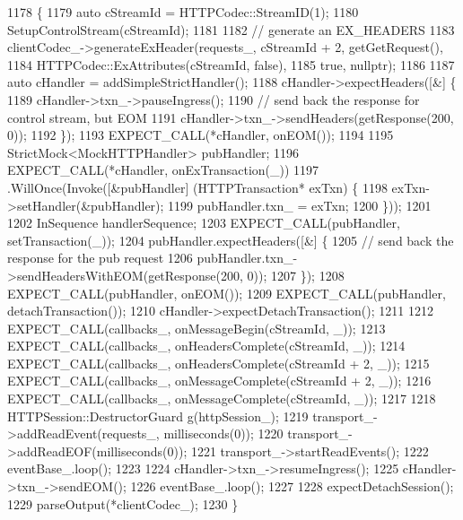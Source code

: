 \begin{DoxyCode}
1178                                                              \{
1179   \textcolor{keyword}{auto} cStreamId = HTTPCodec::StreamID(1);
1180   SetupControlStream(cStreamId);
1181 
1182   \textcolor{comment}{// generate an EX\_HEADERS}
1183   clientCodec\_->generateExHeader(requests\_, cStreamId + 2, getGetRequest(),
1184                                  HTTPCodec::ExAttributes(cStreamId, \textcolor{keyword}{false}),
1185                                  \textcolor{keyword}{true}, \textcolor{keyword}{nullptr});
1186 
1187   \textcolor{keyword}{auto} cHandler = addSimpleStrictHandler();
1188   cHandler->expectHeaders([&] \{
1189       cHandler->txn\_->pauseIngress();
1190       \textcolor{comment}{// send back the response for control stream, but EOM}
1191       cHandler->txn\_->sendHeaders(getResponse(200, 0));
1192     \});
1193   EXPECT\_CALL(*cHandler, onEOM());
1194 
1195   StrictMock<MockHTTPHandler> pubHandler;
1196   EXPECT\_CALL(*cHandler, onExTransaction(\_))
1197     .WillOnce(Invoke([&pubHandler] (HTTPTransaction* exTxn) \{
1198           exTxn->setHandler(&pubHandler);
1199           pubHandler.txn\_ = exTxn;
1200         \}));
1201 
1202   InSequence handlerSequence;
1203   EXPECT\_CALL(pubHandler, setTransaction(\_));
1204   pubHandler.expectHeaders([&] \{
1205       \textcolor{comment}{// send back the response for the pub request}
1206       pubHandler.txn\_->sendHeadersWithEOM(getResponse(200, 0));
1207     \});
1208   EXPECT\_CALL(pubHandler, onEOM());
1209   EXPECT\_CALL(pubHandler, detachTransaction());
1210   cHandler->expectDetachTransaction();
1211 
1212   EXPECT\_CALL(callbacks\_, onMessageBegin(cStreamId, \_));
1213   EXPECT\_CALL(callbacks\_, onHeadersComplete(cStreamId, \_));
1214   EXPECT\_CALL(callbacks\_, onHeadersComplete(cStreamId + 2, \_));
1215   EXPECT\_CALL(callbacks\_, onMessageComplete(cStreamId + 2, \_));
1216   EXPECT\_CALL(callbacks\_, onMessageComplete(cStreamId, \_));
1217 
1218   HTTPSession::DestructorGuard g(httpSession\_);
1219   transport\_->addReadEvent(requests\_, milliseconds(0));
1220   transport\_->addReadEOF(milliseconds(0));
1221   transport\_->startReadEvents();
1222   eventBase\_.loop();
1223 
1224   cHandler->txn\_->resumeIngress();
1225   cHandler->txn\_->sendEOM();
1226   eventBase\_.loop();
1227 
1228   expectDetachSession();
1229   parseOutput(*clientCodec\_);
1230 \}
\end{DoxyCode}
